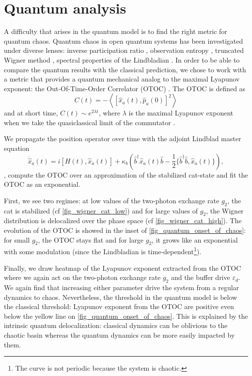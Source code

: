 \documentclass[aps,prx,reprint,floatfix,amsmath,amssymb,longbibliography]{revtex4-2}
\newcommand{\eps}{\varepsilon}
\newcommand{\da}{^\dagger}
\begin{document}
\section{Quantum analysis}
\label{sec:quantum_analysis}

A difficulty that arises in the quantum model is to find the right metric for quantum chaos. Quantum chaos in open quantum systems has been investigated under diverse lenses: inverse participation ratio \cite{Borner2024Aug}, observation entropy \cite{Pg2022Dec}, truncated Wigner method \cite{Pappalardi2020Aug}, spectral properties of the Lindbladian \cite{Sa2020Apr}. In order to be able to compare the quantum results with the classical prediction, we chose to work with a metric that provides a quantum mechanical analog to the maximal Lyapunov exponent: the Out-Of-Time-Order Correlator (OTOC) \cite{Larkin1969Jun}. The OTOC is defined as 
\begin{equation}
    C(t)=-\left\langle\left[\hat x_a(t),\hat p_a(0)\right]^2\right\rangle
\end{equation}
and at short time, $C(t)\sim e^{2\lambda t}$, where $\lambda$ is the maximal Lyapunov exponent when we take the quasiclassical limit of the commutator \cite{Garcia-Mata2022Sep}.

We propagate the position operator over time with the adjoint Lindblad master equation \cite[p.~125]{Breuer2006Jan}
\begin{equation}
    \dot{\hat x}_a(t) = i[H(t),\hat x_a(t)]+\kappa_b \left(\hat b\da\hat x_a(t)\hat b -\frac 1 2 \{\hat b\da \hat b, \hat x_a(t)\}\right),
\end{equation},
compute the OTOC over an approximation of the stabilized cat-state and fit the OTOC as an exponential.

 First, we see two regimes: at low values of the two-photon exchange rate $g_2$, the cat is stabilized (cf \cref{fig_wigner_cat_low}) and for large values of $g_2$, the Wigner distribution is delocalized over the phase space (cf \cref{fig_wigner_cat_high}). The evolution of the OTOC is showed in the inset of \cref{fig_quantum_onset_of_chaos}: for small $g_2$, the OTOC stays flat and for large $g_2$, it grows like an exponential with some modulation (since the Lindbladian is time-dependent\footnote{The curve is not periodic because the system is chaotic.}). 

Finally, we draw heatmap of the Lyapunov exponent extracted from the OTOC where we again act on the two-photon exchange rate $g_2$ and the buffer drive $\eps_d$. We again find that increasing either parameter drive the system from a regular dynamics to chaos. Nevertheless, the threshold in the quantum model is below the classical threshold: Lyapunov exponent from the OTOC are positive even below the yellow line on \cref{fig_quantum_onset_of_chaos}. This is explained by the intrinsic quantum delocalization: classical dynamics can be oblivious to the chaotic basin whereas the quantum dynamics can be more easily impacted by them.
\end{document}
